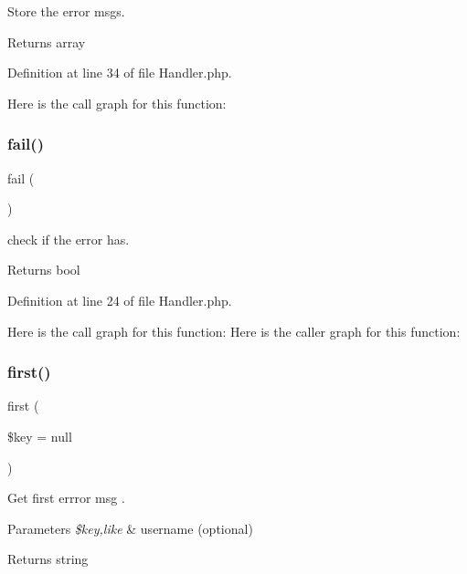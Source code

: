 Store the error msgs.

\begin{DoxyReturn}{Returns}
array 
\end{DoxyReturn}


Definition at line 34 of file Handler.\+php.

Here is the call graph for this function\+:
\mbox{\label{class_zest_1_1_auth_1_1_handler_ac59dac7398e43cca6e7a717ac210c750}} 
\subsubsection{\texorpdfstring{fail()}{fail()}}
{\footnotesize\ttfamily fail (\begin{DoxyParamCaption}{ }\end{DoxyParamCaption})}

check if the error has.

\begin{DoxyReturn}{Returns}
bool 
\end{DoxyReturn}


Definition at line 24 of file Handler.\+php.

Here is the call graph for this function\+:
Here is the caller graph for this function\+:
\mbox{\label{class_zest_1_1_auth_1_1_handler_a8844e8bf9ee1b7d2890e115bb6398cd4}} 
\subsubsection{\texorpdfstring{first()}{first()}}
{\footnotesize\ttfamily first (\begin{DoxyParamCaption}\item[{}]{\$key = {\ttfamily null} }\end{DoxyParamCaption})}

Get first errror msg .


\begin{DoxyParams}{Parameters}
{\em \$key,like} & username (optional)\\
\hline
\end{DoxyParams}
\begin{DoxyReturn}{Returns}
string 
\end{DoxyReturn}


